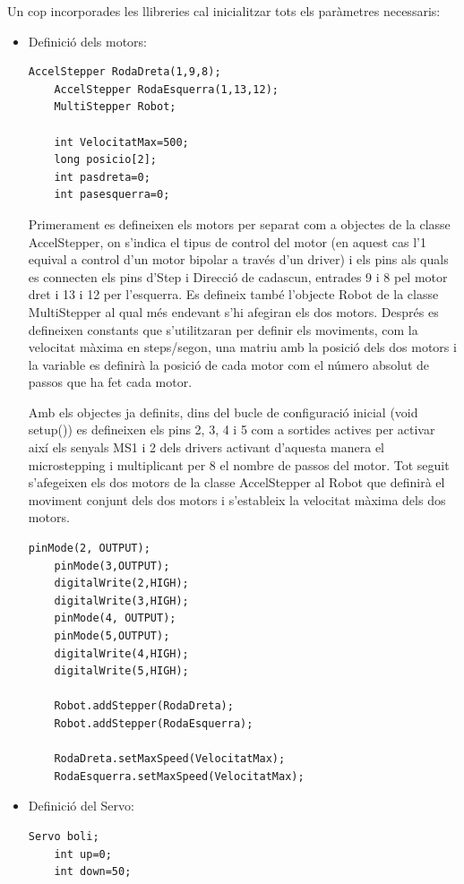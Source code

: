 Un cop incorporades les llibreries cal inicialitzar tots els paràmetres necessaris: 

\begin{itemize}
	\item Definició dels motors: 
	
	\begin{lstlisting}[style=Arduino]
	AccelStepper RodaDreta(1,9,8);
	AccelStepper RodaEsquerra(1,13,12);
	MultiStepper Robot;
	
	int VelocitatMax=500;
	long posicio[2];
	int pasdreta=0; 
	int pasesquerra=0;
	\end{lstlisting}
	
	
	Primerament es defineixen els motors per separat com a objectes de la classe AccelStepper, on s’indica el tipus de control del motor (en aquest cas l’1 equival a control d’un motor bipolar a través d’un driver) i els pins als quals es connecten els pins d’Step i Direcció de cadascun, entrades 9 i 8 pel motor dret i 13 i 12 per l’esquerra. Es defineix també l’objecte Robot de la classe MultiStepper al qual més endevant s’hi afegiran els dos motors. Després es defineixen constants que s’utilitzaran per definir els moviments, com la velocitat màxima en steps/segon, una matriu amb la posició dels dos motors i la variable es definirà la posició de cada motor com el número absolut de passos que ha fet cada motor. 
	
	Amb els objectes ja definits, dins del bucle de configuració inicial (void setup()) es defineixen els pins 2, 3, 4 i 5 com a sortides actives per activar així els senyals MS1 i 2 dels drivers activant d’aquesta manera el microstepping i multiplicant per 8 el nombre de passos del motor. Tot seguit s’afegeixen els dos motors de la classe AccelStepper al Robot que definirà el moviment conjunt dels dos motors i s’estableix la velocitat màxima dels dos motors. 
	
	\begin{lstlisting}[style=Arduino]
	pinMode(2, OUTPUT); 
	pinMode(3,OUTPUT);
	digitalWrite(2,HIGH);
	digitalWrite(3,HIGH);
	pinMode(4, OUTPUT);
	pinMode(5,OUTPUT);
	digitalWrite(4,HIGH);
	digitalWrite(5,HIGH);
	
	Robot.addStepper(RodaDreta);
	Robot.addStepper(RodaEsquerra);
	
	RodaDreta.setMaxSpeed(VelocitatMax);	
	RodaEsquerra.setMaxSpeed(VelocitatMax);
	\end{lstlisting}	
	\item Definició del Servo:
	\begin{lstlisting}[style=Arduino]
	Servo boli;
	int up=0;
	int down=50;
	\end{lstlisting}
	

\end{itemize}
